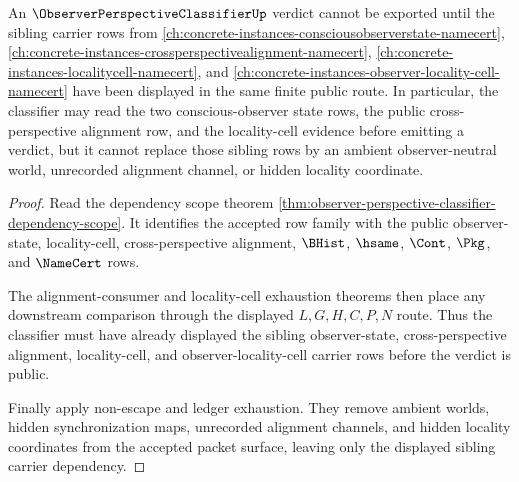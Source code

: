 \begin{theorem}
\label{thm:observer-perspective-classifier-sibling-carrier-dependency}
An $\ObserverPerspectiveClassifierUp$ verdict cannot be exported until the
sibling carrier rows from
\autoref{ch:concrete-instances-consciousobserverstate-namecert},
\autoref{ch:concrete-instances-crossperspectivealignment-namecert},
\autoref{ch:concrete-instances-localitycell-namecert}, and
\autoref{ch:concrete-instances-observer-locality-cell-namecert} have been
displayed in the same finite public route. In particular, the classifier may
read the two conscious-observer state rows, the public cross-perspective
alignment row, and the locality-cell evidence before emitting a verdict, but it
cannot replace those sibling rows by an ambient observer-neutral world,
unrecorded alignment channel, or hidden locality coordinate.
\end{theorem}
\begin{proof}
Read the dependency scope theorem
\autoref{thm:observer-perspective-classifier-dependency-scope}. It identifies
the accepted row family with the public observer-state, locality-cell,
cross-perspective alignment, $\BHist$, $\hsame$, $\Cont$, $\Pkg$, and
$\NameCert$ rows.

The alignment-consumer and locality-cell exhaustion theorems then place any
downstream comparison through the displayed $L,G,H,C,P,N$ route. Thus the
classifier must have already displayed the sibling observer-state,
cross-perspective alignment, locality-cell, and observer-locality-cell carrier
rows before the verdict is public.

Finally apply non-escape and ledger exhaustion. They remove ambient worlds,
hidden synchronization maps, unrecorded alignment channels, and hidden locality
coordinates from the accepted packet surface, leaving only the displayed
sibling carrier dependency.
\end{proof}


